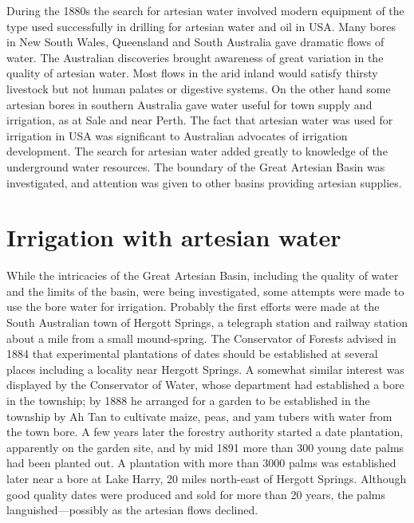 During the 1880s the search for artesian water involved modern
equipment of the type used successfully in drilling for artesian water
and oil in USA.  Many bores in New South Wales, Queensland and South
Australia gave dramatic flows of water.  The Australian discoveries
brought awareness of great variation in the quality of artesian water.
Most flows in the arid inland would satisfy thirsty livestock but not
human palates or digestive systems.  On the other hand some artesian
bores in southern Australia gave water useful for town supply and
irrigation, as at Sale and near Perth.  The fact that artesian water
was used for irrigation in USA  was significant to
Australian advocates of irrigation development.  The search for
artesian water added greatly to knowledge of the underground water
resources.  The boundary of the Great Artesian Basin was investigated,
and attention was given to other basins providing artesian
supplies.

\section*{Irrigation with artesian water}

While the intricacies of the Great Artesian Basin, including the
quality of water and the limits of the basin, were being investigated,
some attempts were made to use the bore water for irrigation.
Probably the first efforts were made at the South Australian town of
Hergott Springs,  a telegraph station and
railway station about a mile from a small mound-spring.  The
Conservator of Forests advised in 1884 that experimental plantations
of dates should be established at several places including a locality
near Hergott Springs.  A somewhat similar interest was displayed by
the Conservator of Water, whose department had established a bore in
the township; by 1888 he arranged for a garden to be established in
the township by Ah Tan  to cultivate maize, peas, and
yam tubers with water from the town bore.  A few years later the
forestry authority started a date plantation, apparently on the garden
site, and by mid 1891 more than 300 young date palms had been planted
out.  A plantation with more than 3000 palms was established later
near a bore at Lake Harry,  20 miles north-east of
Hergott Springs. Although good quality dates were produced and sold
for more than 20 years, the palms languished---possibly as the
artesian flows declined.


